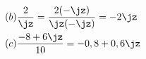 \begin{align}
(b) & \frac{2}{\jz} = \frac{2 (-\jz)}{\jz (-\jz)} = - 2 \jz
\\
(c) & \frac{-8+6\jz}{10} = -0,8
 + 0,6 \jz
\end{align}
